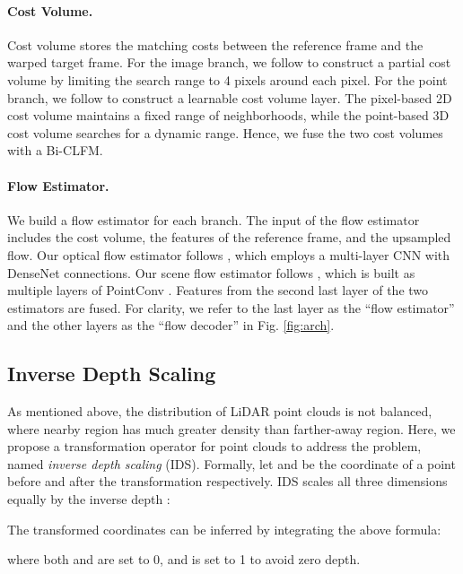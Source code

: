 \documentclass[10pt,twocolumn,letterpaper]{article}
\begin{document}
\vspace{-10pt}
\paragraph{Cost Volume.} Cost volume stores the matching costs between the reference frame and the warped target frame. For the image branch, we follow \cite{sun2018pwc} to construct a partial cost volume by limiting the search range to 4 pixels around each pixel. For the point branch, we follow \cite{wu2019pointpwc} to construct a learnable cost volume layer. The pixel-based 2D cost volume maintains a fixed range of neighborhoods, while the point-based 3D cost volume searches for a dynamic range. Hence, we fuse the two cost volumes with a Bi-CLFM. 

\vspace{-10pt}
\paragraph{Flow Estimator.} We build a flow estimator for each branch. The input of the flow estimator includes the cost volume, the features of the reference frame, and the upsampled flow. Our optical flow estimator follows \cite{sun2018pwc}, which employs a multi-layer CNN with DenseNet \cite{huang2017densenet} connections. Our scene flow estimator follows \cite{wu2019pointpwc}, which is built as multiple layers of PointConv \cite{wu2019pointconv}. Features from the second last layer of the two estimators are fused. For clarity, we refer to the last layer as the ``flow estimator'' and the other layers as the ``flow decoder'' in Fig. \ref{fig:arch}.

\subsection{Inverse Depth Scaling}
\label{sec:ids}

As mentioned above, the distribution of LiDAR point clouds is not balanced, where nearby region has much greater density than farther-away region. Here, we propose a transformation operator for point clouds to address the problem, named \textit{inverse depth scaling} (IDS). Formally, let  and  be the coordinate of a point before and after the transformation respectively. IDS scales all three dimensions equally by the inverse depth :


The transformed coordinates  can be inferred by integrating the above formula:

where both  and  are set to 0, and  is set to 1 to avoid zero depth.
\end{document}
